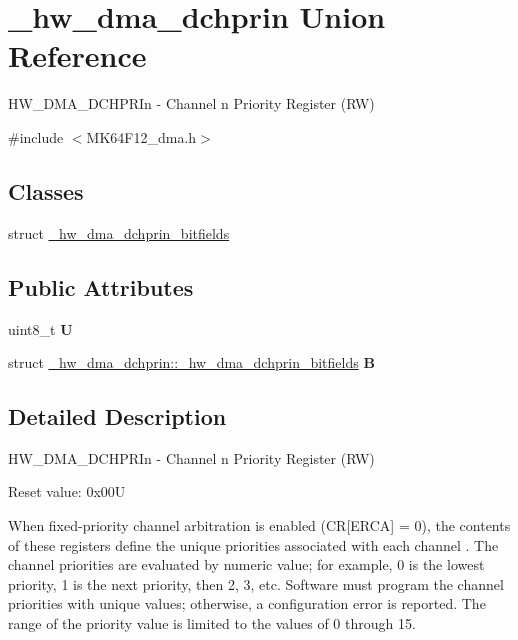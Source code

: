 \hypertarget{union__hw__dma__dchprin}{}\section{\+\_\+hw\+\_\+dma\+\_\+dchprin Union Reference}
\label{union__hw__dma__dchprin}


H\+W\+\_\+\+D\+M\+A\+\_\+\+D\+C\+H\+P\+R\+In -\/ Channel n Priority Register (RW)  




{\ttfamily \#include $<$M\+K64\+F12\+\_\+dma.\+h$>$}

\subsection*{Classes}
\begin{DoxyCompactItemize}
\item 
struct \hyperlink{struct__hw__dma__dchprin_1_1__hw__dma__dchprin__bitfields}{\+\_\+hw\+\_\+dma\+\_\+dchprin\+\_\+bitfields}
\end{DoxyCompactItemize}
\subsection*{Public Attributes}
\begin{DoxyCompactItemize}
\item 
uint8\+\_\+t {\bfseries U}\hypertarget{union__hw__dma__dchprin_aec4e7fe67f25ce93cfcd984ccd1da10d}{}\label{union__hw__dma__dchprin_aec4e7fe67f25ce93cfcd984ccd1da10d}

\item 
struct \hyperlink{struct__hw__dma__dchprin_1_1__hw__dma__dchprin__bitfields}{\+\_\+hw\+\_\+dma\+\_\+dchprin\+::\+\_\+hw\+\_\+dma\+\_\+dchprin\+\_\+bitfields} {\bfseries B}\hypertarget{union__hw__dma__dchprin_a8f9d37d1edb2dc41e56f967f66e17293}{}\label{union__hw__dma__dchprin_a8f9d37d1edb2dc41e56f967f66e17293}

\end{DoxyCompactItemize}


\subsection{Detailed Description}
H\+W\+\_\+\+D\+M\+A\+\_\+\+D\+C\+H\+P\+R\+In -\/ Channel n Priority Register (RW) 

Reset value\+: 0x00U

When fixed-\/priority channel arbitration is enabled (CR\mbox{[}E\+R\+CA\mbox{]} = 0), the contents of these registers define the unique priorities associated with each channel . The channel priorities are evaluated by numeric value; for example, 0 is the lowest priority, 1 is the next priority, then 2, 3, etc. Software must program the channel priorities with unique values; otherwise, a configuration error is reported. The range of the priority value is limited to the values of 0 through 15. 

